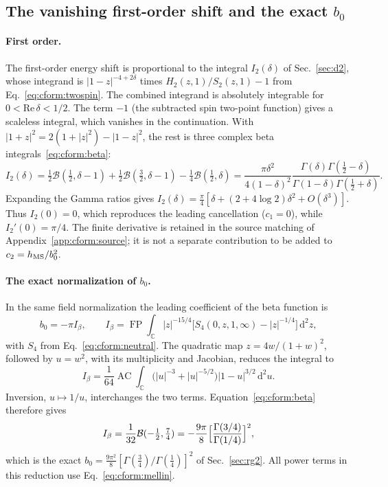 \documentclass[11pt,a4paper]{article}
\numberwithin{equation}{section}
\newcommand{\dd}{\,\mathrm d}
\newcommand{\AC}{\operatorname{AC}}
\newcommand{\FP}{\operatorname{FP}}
\newcommand{\hMS}{h_{\rm MS}}
\begin{document}
\subsection{The vanishing first-order shift and the exact \texorpdfstring{$b_0$}{b0}}\label{app:cform:lower}
\paragraph{First order.} The first-order energy shift is proportional to the integral $I_2(\delta)$ of
Sec.~\ref{sec:d2}, whose integrand is $|1-z|^{-4+2\delta}$ times $H_2(z,1)/S_2(z,1)-1$ from
Eq.~\eqref{eq:cform:twospin}. The combined integrand is absolutely integrable for $0<\mathrm{Re}\,\delta<1/2$. The term
$-1$ (the subtracted spin two-point function) gives a scaleless integral, which vanishes in the continuation. With
$|1+z|^2=2(1+|z|^2)-|1-z|^2$, the rest is three complex beta integrals~\eqref{eq:cform:beta}:
\begin{equation}
 I_2(\delta)=\tfrac12\mathcal B(\tfrac12,\delta-1)+\tfrac12\mathcal B(\tfrac32,\delta-1)-\tfrac14\mathcal B(\tfrac12,\delta)
 =\frac{\pi\delta^2}{4(1-\delta)^2}\frac{\Gamma(\delta)\Gamma(\frac12-\delta)}{\Gamma(1-\delta)\Gamma(\frac12+\delta)}.
\end{equation}
Expanding the Gamma ratios gives $I_2(\delta)=\frac\pi4[\delta+(2+4\log2)\delta^2+O(\delta^3)]$. Thus $I_2(0)=0$, which
reproduces the leading cancellation ($c_1=0$), while $I_2'(0)=\pi/4$. The finite derivative is retained in the source
matching of Appendix~\ref{app:cform:source}; it is not a separate contribution to be added to $c_2=\hMS/b_0^2$.

\paragraph{The exact normalization of $b_0$.} In the same field normalization the leading coefficient of the beta
function is
\begin{equation}
 b_0=-\pi I_\beta,\qquad
 I_\beta=\FP\!\int_{\mathbb C}|z|^{-15/4}\bigl[S_4(0,z,1,\infty)-|z|^{-1/4}\bigr]\dd^2z,
 \label{eq:cform:Ibeta}
\end{equation}
with $S_4$ from Eq.~\eqref{eq:cform:neutral}. The quadratic map $z=4w/(1+w)^2$, followed by $u=w^2$, with its
multiplicity and Jacobian, reduces the integral to
\begin{equation}
 I_\beta=\frac1{64}\AC\!\int_{\mathbb C}\bigl(|u|^{-3}+|u|^{-5/2}\bigr)|1-u|^{3/2}\dd^2u.
\end{equation}
Inversion, $u\mapsto1/u$, interchanges the two terms. Equation~\eqref{eq:cform:beta} therefore gives
\begin{equation}
 I_\beta=\frac1{32}\mathcal B(-\tfrac12,\tfrac74)=-\frac{9\pi}{8}\Bigl[\frac{\Gamma(3/4)}{\Gamma(1/4)}\Bigr]^2,
\end{equation}
which is the exact $b_0=\frac{9\pi^2}{8}[\Gamma(\frac34)/\Gamma(\frac14)]^2$ of Sec.~\ref{sec:rg2}. All power terms in
this reduction use Eq.~\eqref{eq:cform:mellin}.
\end{document}
